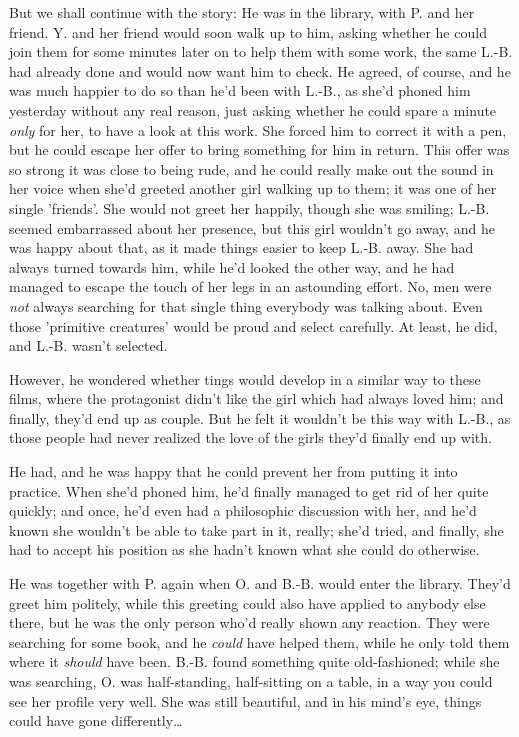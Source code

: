 But we shall continue with the story: He was in the library, with P. and her friend. Y. and her friend would soon walk up to him, asking whether he could join them for some minutes later on to help them with some work, the same L.-B. had already done and would now want him to check. He agreed, of course, and he was much happier to do so than he'd been with L.-B., as she'd phoned him yesterday without any real reason, just asking whether he could spare a minute \emph{only} for her, to have a look at this work. She forced him to correct it with a pen, but he could escape her offer to bring something for him in return. This offer was so strong it was close to being rude, and he could really make out the sound in her voice when she'd greeted another girl walking up to them; it was one of her single 'friends'. She would not greet her happily, though she was smiling; L.-B. seemed embarrassed about her presence, but this girl wouldn't go away, and he was happy about that, as it made things easier to keep L.-B. away. She had always turned towards him, while he'd looked the other way, and he had managed to escape the touch of her legs in an astounding effort. No, men were \emph{not} always searching for that single thing everybody was talking about. Even those 'primitive creatures' would be proud and select carefully. At least, he did, and L.-B. wasn't selected.

However, he wondered whether tings would develop in a similar way to these films, where the protagonist didn't like the girl which had always loved him; and finally, they'd end up as couple. But he felt it wouldn't be this way with L.-B., as those people had never realized the love of the girls they'd finally end up with.

He had, and he was happy that he could prevent her from putting it into practice. When she'd phoned him, he'd finally managed to get rid of her quite quickly; and once, he'd even had a philosophic discussion with her, and he'd known she wouldn't be able to take part in it, really; she'd tried, and finally, she had to accept his position as she hadn't known what she could do otherwise.

He was together with P. again when O. and B.-B. would enter the library. They'd greet him politely, while this greeting could also have applied to anybody else there, but he was the only person who'd really shown any reaction. They were searching for some book, and he \emph{could} have helped them, while he only told them where it \emph{should} have been. B.-B. found something quite old-fashioned; while she was searching, O. was half-standing, half-sitting on a table, in a way you could see her profile very well. She was still beautiful, and in his mind's eye, things could have gone differently\ldots

